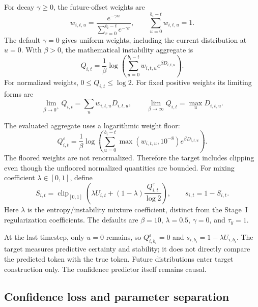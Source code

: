 \documentclass[11pt,a4paper]{article}
\newcommand{\clip}{\operatorname{clip}}
\newcommand{\eps}{\varepsilon}
\numberwithin{equation}{section}
\begin{document}
For decay $\gamma\geq0$, the future-offset weights are
\begin{equation}
w_{i,t,u}=\frac{e^{-\gamma u}}
 {\sum_{r=0}^{b_i-t}e^{-\gamma r}},\qquad
\sum_{u=0}^{b_i-t}w_{i,t,u}=1.
\end{equation}
The default $\gamma=0$ gives uniform weights, including the
current distribution at $u=0$. With $\beta>0$, the mathematical
instability aggregate is
\begin{equation}
Q_{i,t}=\frac1\beta\log\left(
 \sum_{u=0}^{b_i-t}w_{i,t,u}e^{\beta D_{i,t,u}}\right).
\label{eq:instability}
\end{equation}
For normalized weights, $0\leq Q_{i,t}\leq\log2$.
For fixed positive weights its limiting forms are
\begin{equation}
\lim_{\beta\to0^+}Q_{i,t}
 =\sum_u w_{i,t,u}D_{i,t,u},\qquad
\lim_{\beta\to\infty}Q_{i,t}=\max_u D_{i,t,u}.
\end{equation}

The evaluated aggregate uses a logarithmic weight floor:
\begin{equation}
Q^{\eps}_{i,t}=\frac1\beta\log\left(
 \sum_{u=0}^{b_i-t}\max(w_{i,t,u},10^{-8})
                         e^{\beta D_{i,t,u}}\right).
\label{eq:instability-floor}
\end{equation}
The floored weights are not renormalized. Therefore the target includes
clipping even though the unfloored normalized quantities are bounded.
For mixing coefficient $\lambda\in[0,1]$, define
\begin{equation}
S_{i,t}=\clip_{[0,1]}\!\left(
  \lambda U_{i,t}+(1-\lambda)\frac{Q^{\eps}_{i,t}}{\log2}
\right),\qquad
s_{i,t}=1-S_{i,t}.
\label{eq:soft-target}
\end{equation}
Here $\lambda$ is the entropy/instability mixture coefficient, distinct
from the Stage~I regularization coefficients. The defaults are
$\beta=10$, $\lambda=0.5$, $\gamma=0$, and $\tau_y=1$.

At the last timestep, only $u=0$ remains, so $Q^{\eps}_{i,b_i}=0$
and $s_{i,b_i}=1-\lambda U_{i,b_i}$. The target measures predictive
certainty and stability; it does not directly compare the predicted
token with the true token. Future distributions enter target
construction only. The confidence predictor itself remains causal.

\subsection{Confidence loss and parameter separation}
\end{document}
